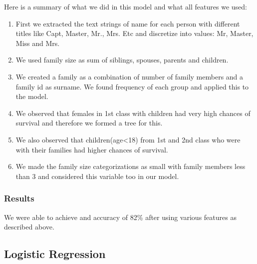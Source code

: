 Here is a summary of what we did in this model and what all features we used:
\begin{enumerate}

\item First we extracted the text strings of name for each person with different titles like Capt, Master, Mr., Mrs. Etc and discretize into values: Mr, Master, Miss and Mrs.

\item We used family size as sum of siblings, spouses, parents and children.

\item We created a family as a combination of number of family members and a family id as surname. We found frequency of each group and applied this to the model.

\item We observed that females in 1st class with children had very high chances of survival and therefore we formed a tree for this.

\item We also observed that children(age<18) from 1st and 2nd class who were with their families had higher chances of survival.

\item We made the family size categorizations as small with family members less than 3 and considered this variable too in our model.
\end{enumerate}

\subsubsection{Results}
We were able to achieve and accuracy of 82\% after using various features as described above.

\subsection{Logistic Regression}

